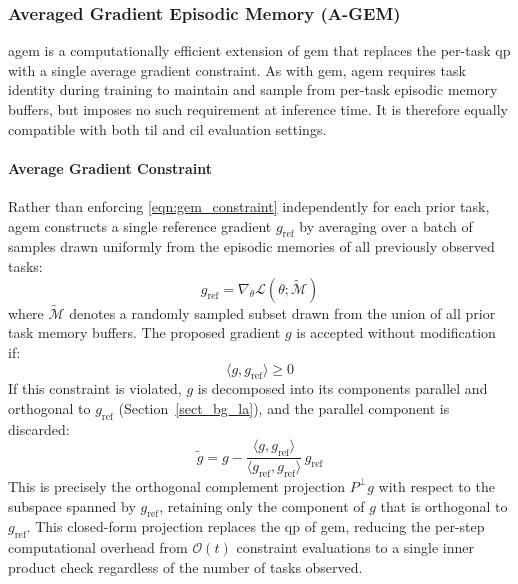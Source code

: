 \subsubsection{Averaged Gradient Episodic Memory (A-GEM)}\label{sec:agem}

\gls{agem} \cite{AGEM} is a computationally efficient extension of
\gls{gem} that replaces the per-task \gls{qp} with a single average gradient
constraint. As with \gls{gem}, \gls{agem} requires task identity during training
to maintain and sample from per-task episodic memory buffers, but imposes no
such requirement at inference time. It is therefore equally compatible with both
\gls{til} and \gls{cil} evaluation settings.

\paragraph{Average Gradient Constraint}

Rather than enforcing \eqref{eqn:gem_constraint} independently for each prior
task, \gls{agem} constructs a single reference gradient $g_\text{ref}$ by
averaging over a batch of samples drawn uniformly from the episodic memories of
all previously observed tasks:
%
\begin{equation}\label{eqn:agem_ref}
    g_\text{ref} = \nabla_\theta \mathcal{L}(\theta; \tilde{\mathcal{M}})
\end{equation}
%
where $\tilde{\mathcal{M}}$ denotes a randomly sampled subset drawn from the
union of all prior task memory buffers. The proposed gradient $g$ is accepted
without modification if:
%
\begin{equation}\label{eqn:agem_constraint}
    \langle g, g_\text{ref} \rangle \geq 0
\end{equation}
%
If this constraint is violated, $g$ is decomposed into its components parallel
and orthogonal to $g_\text{ref}$ (Section~\ref{sect_bg_la}), and the parallel
component is discarded:
%
\begin{equation}\label{eqn:agem_projection}
    \tilde{g} = g - \frac{\langle g, g_\text{ref} \rangle}
    {\langle g_\text{ref}, g_\text{ref} \rangle} \, g_\text{ref}
\end{equation}
%
This is precisely the orthogonal complement projection $P^\perp g$ with respect
to the subspace spanned by $g_\text{ref}$, retaining only the component of $g$
that is orthogonal to $g_\text{ref}$.
%
This closed-form projection replaces the \gls{qp} of \gls{gem}, reducing the
per-step computational overhead from $\mathcal{O}(t)$ constraint evaluations to
a single inner product check regardless of the number of tasks observed.

